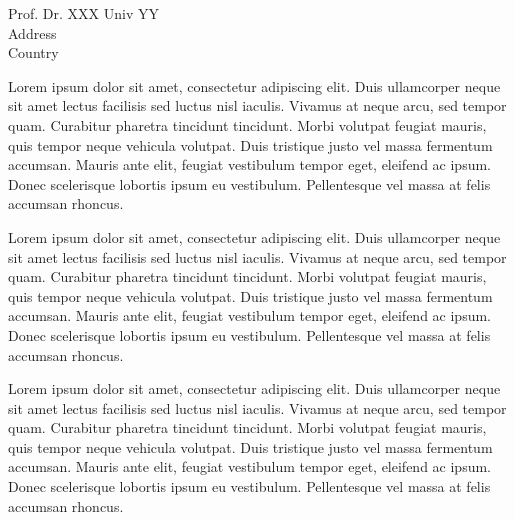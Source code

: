 \documentclass[11pt, a4paper]{cv}
\begin{document}
\makeletterheader[L]{}

\makecvfooter
{}
{}
{}

\recipient
  {Prof. Dr. XXX}
  {Univ YY \\ Address \\ Country}

\makelettertitle

\begin{cvletter}
  
  Lorem ipsum dolor sit amet, consectetur adipiscing elit. Duis
  ullamcorper neque sit amet lectus facilisis sed luctus nisl
  iaculis. Vivamus at neque arcu, sed tempor quam. Curabitur pharetra
  tincidunt tincidunt. Morbi volutpat feugiat mauris, quis tempor
  neque vehicula volutpat. Duis tristique justo vel massa fermentum
  accumsan. Mauris ante elit, feugiat vestibulum tempor eget, eleifend
  ac ipsum. Donec scelerisque lobortis ipsum eu
  vestibulum. Pellentesque vel massa at felis accumsan rhoncus.

  Lorem ipsum dolor sit amet, consectetur adipiscing elit. Duis
  ullamcorper neque sit amet lectus facilisis sed luctus nisl
  iaculis. Vivamus at neque arcu, sed tempor quam. Curabitur pharetra
  tincidunt tincidunt. Morbi volutpat feugiat mauris, quis tempor
  neque vehicula volutpat. Duis tristique justo vel massa fermentum
  accumsan. Mauris ante elit, feugiat vestibulum tempor eget, eleifend
  ac ipsum. Donec scelerisque lobortis ipsum eu
  vestibulum. Pellentesque vel massa at felis accumsan rhoncus.

  Lorem ipsum dolor sit amet, consectetur adipiscing elit. Duis
  ullamcorper neque sit amet lectus facilisis sed luctus nisl
  iaculis. Vivamus at neque arcu, sed tempor quam. Curabitur pharetra
  tincidunt tincidunt. Morbi volutpat feugiat mauris, quis tempor
  neque vehicula volutpat. Duis tristique justo vel massa fermentum
  accumsan. Mauris ante elit, feugiat vestibulum tempor eget, eleifend
  ac ipsum. Donec scelerisque lobortis ipsum eu
  vestibulum. Pellentesque vel massa at felis accumsan rhoncus.

\end{cvletter}

\makeletterclosing




\end{document}
